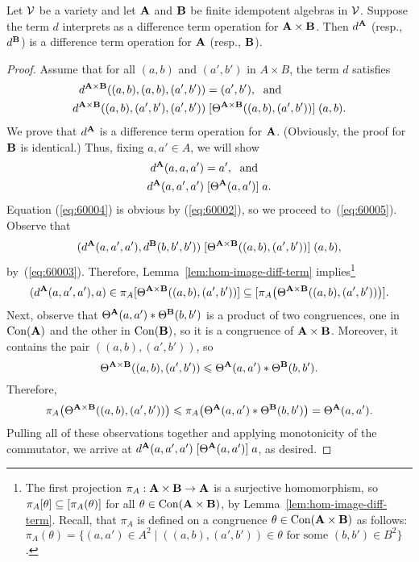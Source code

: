 \begin{lem}
  \label{lem:products}
  Let $\mathcal{V}$ be a variety and let $\mathbf{A}$ and $\mathbf{B}$ be finite idempotent
  algebras in $\mathcal{V}$. Suppose the term $d$ 
  interprets as a difference term operation for $\mathbf{A}\times \mathbf{B}$.
  Then $d^{\mathbf{A}}$ (resp., $d^{\mathbf{B}}$) is a difference term operation for 
  $\mathbf{A}$  (resp., $\mathbf{B}$).
\end{lem}
\begin{proof}
  Assume that for all $(a, b)$ and $(a', b')$ in $A \times B$, the term $d$ satisfies
  \begin{align}
    d^{\mathbf{A} \times \mathbf{B}}((a, b), (a, b), (a', b')) &= (a', b'),\; \text{ and } \label{eq:60002}\\
    d^{\mathbf{A} \times \mathbf{B}}((a, b), (a', b'), (a', b'))
    &\mathrel{[\Theta^{\mathbf{A} \times \mathbf{B}}((a, b), (a', b'))]} (a, b). \label{eq:60003}
  \end{align}
  We prove that $d^{\mathbf{A}}$ is a difference term operation
  for $\mathbf{A}$. (Obviously, the proof for $\mathbf{B}$ is identical.)
  Thus, fixing $a, a' \in A$, we will show 
  \begin{align}
    d^{\mathbf{A}}(a, a, a') &= a',\; \text{ and } \label{eq:60004}\\
    d^{\mathbf{A}}(a,a',a')
    &\mathrel{[\Theta^{\mathbf{A}}(a, a')]} a. \label{eq:60005}
  \end{align}
  Equation (\ref{eq:60004}) is obvious by (\ref{eq:60002}),
  so we proceed to~(\ref{eq:60005}).
  Observe that 
  \[
  (d^{\mathbf{A}}(a, a',a'), d^{\mathbf{B}}(b, b',b'))
  \mathrel{[\Theta^{\mathbf{A} \times \mathbf{B}}((a, b), (a', b'))]} (a, b),
  \]
  by~(\ref{eq:60003}). Therefore, Lemma~\ref{lem:hom-image-diff-term}
  implies\footnote{The first projection 
    $\pi_A : \mathbf{A} \times \mathbf{B} \to \mathbf{A}$ is a surjective 
    homomorphism, so 
  $\pi_A [\theta] \subseteq [\pi_A(\theta)]$
    for all $\theta \in \operatorname{Con} (\mathbf{A} \times \mathbf{B})$,
    by Lemma~\ref{lem:hom-image-diff-term}. Recall, that
    $\pi_A$ is defined on a congruence $\theta \in \operatorname{Con}(\mathbf{A} \times \mathbf{B})$ as follows:
    $\pi_A(\theta) = \{(a,a') \in A^2 \mid ((a,b),(a',b')) \in \theta \text{ for
      some $(b,b')\in B^2$}\}$.}
  \[
    (d^{\mathbf{A}}(a, a',a'), a)\in \pi_A [\Theta^{\mathbf{A} \times \mathbf{B}}((a, b), (a', b'))]
    \subseteq [\pi_A\bigl(\Theta^{\mathbf{A} \times \mathbf{B}}((a, b), (a', b'))\bigr)].
  \]
  Next, observe that 
  $\Theta^{\mathbf{A}}(a,a') \ast \Theta^{\mathbf{B}}(b,b')$  %
  is a product of two congruences, one in $\operatorname{Con}(\mathbf{A})$ and the
  other in $\operatorname{Con}(\mathbf{B})$, so it is a congruence of $\mathbf{A}\times \mathbf{B}$.
  Moreover, it contains the pair $((a,b), (a',b'))$, so
  \[
  \Theta^{\mathbf{A} \times \mathbf{B}}((a, b), (a', b'))\leqslant \Theta^{\mathbf{A}}(a,a') \ast \Theta^{\mathbf{B}}(b,b').
  \]
  Therefore, 
  \[
  \pi_A\bigl(\Theta^{\mathbf{A} \times \mathbf{B}}((a, b), (a', b'))\bigr)
  \leqslant
  \pi_A\bigl(\Theta^{\mathbf{A}}(a,a') \ast \Theta^{\mathbf{B}}(b,b')\bigr) = 
  \Theta^{\mathbf{A}}(a,a').
  \]
  Pulling all of these observations together and applying monotonicity of the
  commutator, we arrive at $d^{\mathbf{A}}(a, a',a')  \mathrel{[\Theta^{\mathbf{A}}(a,a')]} a$, as desired.
\end{proof}

